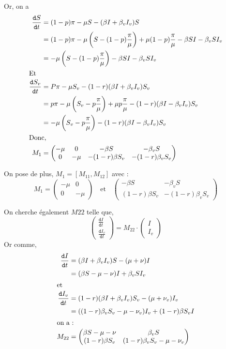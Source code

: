 \documentclass[11pt]{article}
\newcommand{\deriv}{\texttt{d}}
\newcommand{\dt}[1]{\frac{\deriv #1}{\deriv t}}
\begin{document}
Or, on a
\begin{align*}
\dt S &= (1-p)\pi -\mu S - (\beta I + \beta_v I_v)S\\
&=  (1-p) \pi - \mu \left(S -(1-p)\frac{\pi}{\mu}\right)+ \mu (1-p)\frac{\pi}{\mu}- \beta SI - \beta_v S I_v\\
&= - \mu \left(S -(1-p)\frac{\pi}{\mu}\right)- \beta SI - \beta_v S I_v\\
\intertext{Et}
\dt {S_v} &= P \pi - \mu S_v - (1-r)(\beta I + \beta_v I_v)S_v\\
&= p \pi - \mu \left(S_v - p \frac{\pi}{\mu}\right) + \mu p \frac{\pi}{\mu} - (1-r)(\beta I - \beta_v I_v)S_v\\
&= - \mu \left(S_v - p \frac{\pi}{\mu}\right)  - (1-r)(\beta I - \beta_v I_v)S_v\\
\intertext{Donc,}
M_1 &= \begin{pmatrix}
-\mu & 0 & -\beta S & - \beta_v S\\
0 & -\mu & -(1-r) \beta S_v & -(1-r) \beta_v S_v
\end{pmatrix}
\end{align*}

On pose de plus, $M_1 = [M_{11}, M_{12}]$ avec :
\[M_1 = \begin{pmatrix}
-\mu & 0 \\
0 & -\mu 
\end{pmatrix}
\quad \text{et} \quad 
\begin{pmatrix}
-\beta S & - \beta_v S\\
(1-r) \beta S_v & -(1-r) \beta_v S_v
\end{pmatrix}
\]


On cherche \'egalement $M{22}$ telle que,
 \[
\begin{pmatrix}
\dt I\\
\dt {I_v} 
\end{pmatrix} =
M_{22} \cdot \begin{pmatrix}
I\\
I_v
\end{pmatrix}
\]
 Or comme,
 \begin{align*}
 	\dt I &= (\beta I + \beta_v I_v)S - (\mu + \nu) I\\
 		&= (\beta  S - \mu - \nu ) I + \beta_v S I_v\\
 	\intertext{et}
 	\dt {I_v} &= (1-r)(\beta I+ \beta_vI_v)S_v - (\mu + \nu_v)I_v\\
 		&= ((1-r)\beta_v S_v - \mu - \nu_v )I_v + (1-r)\beta S_v I\\
 	\intertext{on a :}
 	M_{22} &=  \begin{pmatrix}
		\beta S - \mu - \nu  & \beta_v S\\
 		(1-r)\beta S_v & (1-r)\beta_v S_v - \mu - \nu_v 
	\end{pmatrix}
 \end{align*}
\end{document}
